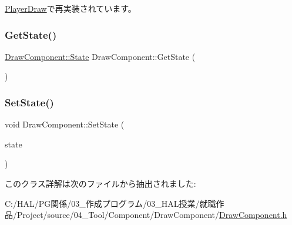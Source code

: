 \mbox{\hyperlink{class_player_draw_a96eb31c32c0016cd6c908dc67032a7ed}{Player\+Draw}}で再実装されています。

\mbox{\label{class_draw_component_a5e4b82b07bda97a67ef6aeb5ba5b4b16}} 
\subsubsection{\texorpdfstring{Get\+State()}{GetState()}}
{\footnotesize\ttfamily \mbox{\hyperlink{class_draw_component_adde17e0eff392abede5f59463cc54032}{Draw\+Component\+::\+State}} Draw\+Component\+::\+Get\+State (\begin{DoxyParamCaption}{ }\end{DoxyParamCaption})\hspace{0.3cm}{\ttfamily [inline]}}

\mbox{\label{class_draw_component_a9f415e9e80142c6a8a0a399dd41febc8}} 
\subsubsection{\texorpdfstring{Set\+State()}{SetState()}}
{\footnotesize\ttfamily void Draw\+Component\+::\+Set\+State (\begin{DoxyParamCaption}\item[{\mbox{\hyperlink{class_draw_component_adde17e0eff392abede5f59463cc54032}{Draw\+Component\+::\+State}}}]{state }\end{DoxyParamCaption})\hspace{0.3cm}{\ttfamily [inline]}}



このクラス詳解は次のファイルから抽出されました\+:\begin{DoxyCompactItemize}
\item 
C\+:/\+H\+A\+L/\+P\+G関係/03\+\_\+作成プログラム/03\+\_\+\+H\+A\+L授業/就職作品/\+Project/source/04\+\_\+\+Tool/\+Component/\+Draw\+Component/\mbox{\hyperlink{_draw_component_8h}{Draw\+Component.\+h}}\end{DoxyCompactItemize}
